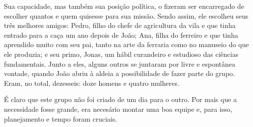 Sua capacidade, mas também sua posição política, o fizeram ser encarregado de escolher quantos e quem quisesse para sua missão. Sendo assim, ele escolheu seus três melhores amigos: Pedro, filho do chefe de agricultura da vila e que tinha entrado para a caça um ano depois de João; Ana, filha do ferreiro e que tinha aprendido muito com seu pai, tanto na arte da ferraria como no manuseio do que ele produzia; e seu primo, Jonas, um hábil curandeiro e estudioso das ciências fundamentais. Junto a eles, alguns outros se juntaram por livre e espontânea vontade, quando João abriu à aldeia a possibilidade de fazer parte do grupo. Eram, no total, dezesseis: doze homens e quatro mulheres.

É claro que este grupo não foi criado de um dia para o outro. Por mais que a necessidade fosse grande, era necesário montar uma boa equipe e, para isso, planejamento e tempo foram cruciais.
